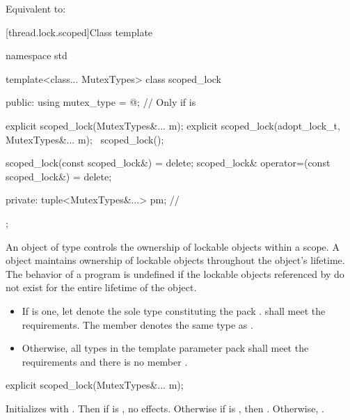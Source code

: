 \begin{itemdescr}
\pnum
\effects
Equivalent to: 
\end{itemdescr}

[thread.lock.scoped]{Class template }

%
\begin{codeblock}
namespace std {
  template<class... MutexTypes>
  class scoped_lock {
  public:
    using mutex_type = @\seebelow@;     // Only if  is 

    explicit scoped_lock(MutexTypes&... m);
    explicit scoped_lock(adopt_lock_t, MutexTypes&... m);
    ~scoped_lock();

    scoped_lock(const scoped_lock&) = delete;
    scoped_lock& operator=(const scoped_lock&) = delete;

  private:
    tuple<MutexTypes&...> pm;   // \expos
  };
}
\end{codeblock}

\pnum
An object of type  controls the ownership of lockable objects
within a scope. A  object maintains ownership of lockable
objects throughout the  object's lifetime.
The behavior of a program is undefined if the lockable objects referenced by
 do not exist for the entire lifetime of the 
object.
\begin{itemize}
\item
If  is one,
let  denote the sole type constituting the pack .
shall meet the  requirements.
The member  
denotes the same type as .
\item
Otherwise, all types in the template parameter pack 
shall meet the  requirements
and there is no member .
\end{itemize}

%
\begin{itemdecl}
explicit scoped_lock(MutexTypes&... m);
\end{itemdecl}

\begin{itemdescr}
\pnum
\effects
Initializes  with .
Then if  is , no effects.
Otherwise if  is , then .
Otherwise, .
\end{itemdescr}

